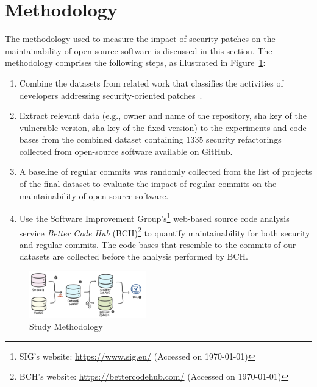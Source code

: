 \documentclass[10pt,conference]{IEEEtran}
\begin{document}
\section{Methodology}\label{sec:methodology}
%
The methodology used to measure the impact of security patches on the
maintainability of open-source software is discussed in this section.
The methodology comprises the following steps, as illustrated in
Figure~\ref{fig:met}:
%
\begin{enumerate}
	\item Combine the datasets from related work that classifies
the activities of developers addressing security-oriented patches~\cite{Reis:2017:IJSSE, 10.1109/MSR.2019.00064}.
%
	\item
	Extract relevant data (e.g., owner and name of
	the repository, sha key of the vulnerable version, sha key of the fixed version) to the experiments and code bases from the combined dataset containing $1335$ security
	refactorings collected from open-source software available on
	GitHub.
%
	\item A baseline of regular commits was randomly collected from the list of
	projects of the final dataset to evaluate the impact of regular commits on the
	maintainability of open-source software.
%
  \item Use the Software Improvement Group's\footnote{SIG's website: \url{https://www.sig.eu/} 
  (Accessed on \today{})} web-based source code analysis
  service \emph{Better Code Hub} (BCH)\footnote{BCH's website:
  \url{https://bettercodehub.com/} (Accessed on \today{})} to quantify maintainability
  for both security and regular commits. The code bases that resemble to the commits
  of our datasets are collected before the analysis performed by BCH.
\end{enumerate}
%
\begin{figure}[h]
 	\centering 	\includegraphics[width=0.45\textwidth]{figures/methodology.pdf}
 	\caption{Study Methodology}
	\label{fig:met}
\end{figure}
%
\end{document}
